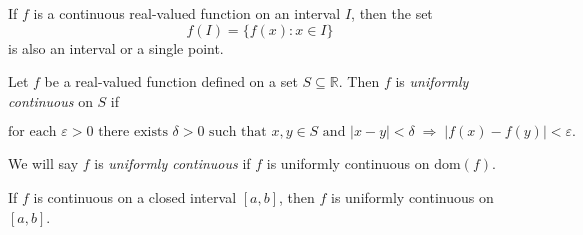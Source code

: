\documentclass[12pt]{article}
\newenvironment{definitionbox}[1][]%
{\begin{tcolorbox}[definitionstyle,title={#1}]}%
{\end{tcolorbox}}
\newenvironment{theorembox}[1][]%
{\begin{tcolorbox}[theoremstyle,title={#1}]}%
{\end{tcolorbox}}
\begin{document}
\begin{theorembox}[Corollary 18.3]
\label{thm:18.3}
If $f$ is a continuous real-valued function on an interval $I$, then the set  
\[
  f(I) = \{ f(x) : x \in I \}
\]
is also an interval or a single point.
\end{theorembox}

\begin{definitionbox}[Definition 19.1 — Uniform Continuity]
\label{def:19.1}
Let $f$ be a real-valued function defined on a set $S \subseteq \mathbb{R}$.  
Then $f$ is \emph{uniformly continuous} on $S$ if  

\[
\text{for each } \varepsilon > 0 \text{ there exists } \delta > 0 \text{ such that }  
x,y \in S \text{ and } |x-y| < \delta \;\Rightarrow\; |f(x)-f(y)| < \varepsilon.
\]

We will say $f$ is \emph{uniformly continuous} if $f$ is uniformly continuous  
on $\mathrm{dom}(f)$.
\end{definitionbox}

\begin{theorembox}[Theorem 19.2]
\label{thm:19.2}
If $f$ is continuous on a closed interval $[a,b]$,  
then $f$ is uniformly continuous on $[a,b]$.
\end{theorembox}
\end{document}
